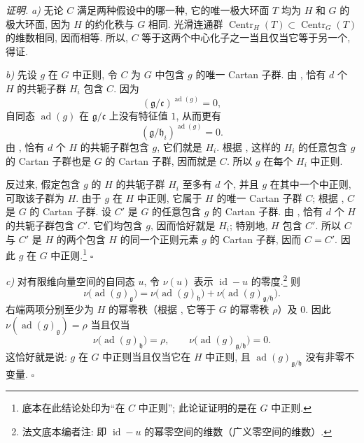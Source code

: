 \noindent\textit{证明.}
\textit{a)} 无论 \(C\) 满足两种假设中的哪一种, 它的唯一极大环面 \(T\) 均为 \(H\) 和 \(G\) 的极大环面, 因为 \(H\) 的约化秩与 \(G\) 相同. 光滑连通群 \(\operatorname{Centr}_H(T)\subset\operatorname{Centr}_G(T)\) 的维数相同, 因而相等. 所以, \(C\) 等于这两个中心化子之一当且仅当它等于另一个,  得证.

\textit{b)} 先设 \(g\) 在 \(G\) 中正则, 令 \(C\) 为 \(G\) 中包含 \(g\) 的唯一 Cartan 子群. 由 , 恰有 \(d\) 个 \(H\) 的共轭子群 \(H_i\) 包含 \(C\). 因为
\[
  (\mathfrak g/\mathfrak c)^{\operatorname{ad}(g)}=0,
\]
自同态 \(\operatorname{ad}(g)\) 在 \(\mathfrak g/\mathfrak c\) 上没有特征值 \(1\), 从而更有
\[
  (\mathfrak g/\mathfrak h_i)^{\operatorname{ad}(g)}=0.
\]
由 , 恰有 \(d\) 个 \(H\) 的共轭子群包含 \(g\), 它们就是 \(H_i\). 根据 , 这样的 \(H_i\) 的任意包含 \(g\) 的 Cartan 子群也是 \(G\) 的 Cartan 子群, 因而就是 \(C\). 所以 \(g\) 在每个 \(H_i\) 中正则.

反过来, 假定包含 \(g\) 的 \(H\) 的共轭子群 \(H_i\) 至多有 \(d\) 个, 并且 \(g\) 在其中一个中正则, 可取该子群为 \(H\). 由于 \(g\) 在 \(H\) 中正则, 它属于 \(H\) 的唯一 Cartan 子群 \(C\); 根据 , \(C\) 是 \(G\) 的 Cartan 子群. 设 \(C'\) 是 \(G\) 的任意包含 \(g\) 的 Cartan 子群. 由 , 恰有 \(d\) 个 \(H\) 的共轭子群包含 \(C'\). 它们均包含 \(g\), 因而恰好就是 \(H_i\); 特别地, \(H\) 包含 \(C'\). 所以 \(C\) 与 \(C'\) 是 \(H\) 的两个包含 \(H\) 的同一个正则元素 \(g\) 的 Cartan 子群, 因而 \(C=C'\). 因此 \(g\) 在 \(G\) 中正则.\footnote{底本在此结论处印为“在 \(C\) 中正则”; 此论证证明的是在 \(G\) 中正则.}
\hfill\(\square\)

\textit{c)} 对有限维向量空间的自同态 \(u\), 令 \(\nu(u)\) 表示 \(\operatorname{id}-u\) 的零度.\footnote{法文底本编者注: 即 \(\operatorname{id}-u\) 的幂零空间的维数（广义零空间的维数）.} 则
\[
  \nu\bigl(\operatorname{ad}(g)_{\mathfrak g}\bigr)
  =
  \nu\bigl(\operatorname{ad}(g)_{\mathfrak h}\bigr)
  +
  \nu\bigl(\operatorname{ad}(g)_{\mathfrak g/\mathfrak h}\bigr).
\]
右端两项分别至少为 \(H\) 的幂零秩（根据 , 它等于 \(G\) 的幂零秩 \(\rho\)）及 \(0\). 因此 \(\nu(\operatorname{ad}(g)_{\mathfrak g})=\rho\) 当且仅当
\[
  \nu\bigl(\operatorname{ad}(g)_{\mathfrak h}\bigr)=\rho,
  \qquad
  \nu\bigl(\operatorname{ad}(g)_{\mathfrak g/\mathfrak h}\bigr)=0.
\]
这恰好就是说: \(g\) 在 \(G\) 中正则当且仅当它在 \(H\) 中正则, 且 \(\operatorname{ad}(g)_{\mathfrak g/\mathfrak h}\) 没有非零不变量. \hfill\(\square\)

